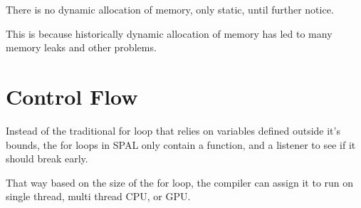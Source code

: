 There is no dynamic allocation of memory, only static, until further notice.

This is because historically dynamic allocation of memory has led to many memory
leaks and other problems. 

\section{Control Flow}
Instead of the traditional for loop that relies on variables defined outside
it's bounds, the for loops in SPAL only contain a function, and a listener to
see if it should break early. 

That way based on the size of the for loop, the compiler can assign it to run on
single thread, multi thread CPU, or GPU.\@ 
